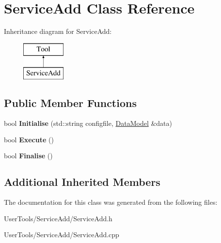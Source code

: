 \hypertarget{classServiceAdd}{\section{Service\-Add Class Reference}
\label{classServiceAdd}
}
Inheritance diagram for Service\-Add\-:\begin{figure}[H]
\begin{center}
\leavevmode
\includegraphics[height=2.000000cm]{classServiceAdd}
\end{center}
\end{figure}
\subsection*{Public Member Functions}
\begin{DoxyCompactItemize}
\item 
\hypertarget{classServiceAdd_a047e44c3d209591703b0bdec1b1b51cd}{bool {\bfseries Initialise} (std\-::string configfile, \hyperlink{classDataModel}{Data\-Model} \&data)}\label{classServiceAdd_a047e44c3d209591703b0bdec1b1b51cd}

\item 
\hypertarget{classServiceAdd_a4908df063074b02e73e589d9f07998ac}{bool {\bfseries Execute} ()}\label{classServiceAdd_a4908df063074b02e73e589d9f07998ac}

\item 
\hypertarget{classServiceAdd_a2e4d3854bcd490935e6e9d39597c7204}{bool {\bfseries Finalise} ()}\label{classServiceAdd_a2e4d3854bcd490935e6e9d39597c7204}

\end{DoxyCompactItemize}
\subsection*{Additional Inherited Members}


The documentation for this class was generated from the following files\-:\begin{DoxyCompactItemize}
\item 
User\-Tools/\-Service\-Add/Service\-Add.\-h\item 
User\-Tools/\-Service\-Add/Service\-Add.\-cpp\end{DoxyCompactItemize}
